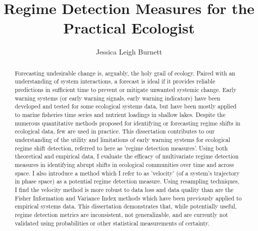 \documentclass[print]{nuthesis}
\begin{document}
\frontmatter


\title{Regime Detection Measures for the Practical Ecologist}
\author{Jessica Leigh Burnett}
\maketitle
\begin{abstract}
	Forecasting undesirable change is, arguably, the holy grail of ecology. Paired with an understanding of system interactions, a forecast is ideal if it provides reliable predictions in sufficient time to prevent or mitigate unwanted systemic change. Early warning systems (or early warning signals, early warning indicators) have been developed and tested for some ecological systems data, but have been mostly applied to marine fisheries time series and nutrient loadings in shallow lakes. Despite the numerous quantitative methods proposed for identifying or forecasting regime shifts in ecological data, few are used in practice. This dissertation contributes to our understanding of the utility and limitations of early warning systems for ecological regime shift detection, referred to here as 'regime detection measures'. 
	Using both theoretical and empirical data, I evaluate the efficacy of multivariate regime detection measures in identifying abrupt shifts in ecological communities over time and across space. I also introduce a method which I refer to as 'velocity' (of a system's trajectory in phase space) as a potential regime detection measure. Using resampling techniques, I find the velocity method is more robust to data loss and data quality than are the Fisher Information and Variance Index methods which have been previously applied to empirical systems data. This dissertation demonstrates that, while potentially useful, regime detection metrics are inconsistent, not generalizable, and are currently not validated using probabilities or other statistical measurements of certainty. 
\end{abstract}
\end{document}
